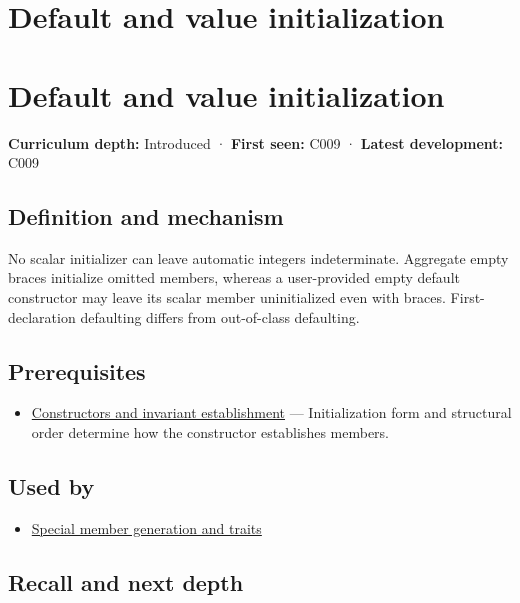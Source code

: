 \hypertarget{appendix-ba8c1a9fe03f}{}
\section*{Default and value initialization}
\section{Default and value initialization}\label{default-and-value-initialization}

\textbf{Curriculum depth:} Introduced · \textbf{First seen:} C009 · \textbf{Latest development:} C009

\subsection{Definition and mechanism}\label{definition-and-mechanism}

No scalar initializer can leave automatic integers indeterminate. Aggregate empty braces initialize omitted members, whereas a user-provided empty default constructor may leave its scalar member uninitialized even with braces. First-declaration defaulting differs from out-of-class defaulting.

\subsection{Prerequisites}\label{prerequisites}

\begin{itemize}
\tightlist
\item
  \hyperref[appendix-7f8ec83d0886]{Constructors and invariant establishment} --- Initialization form and structural order determine how the constructor establishes members.
\end{itemize}

\subsection{Used by}\label{used-by}

\begin{itemize}
\tightlist
\item
  \hyperref[appendix-42e02a12c694]{Special member generation and traits}
\end{itemize}

\subsection{Recall and next depth}\label{recall-and-next-depth}

